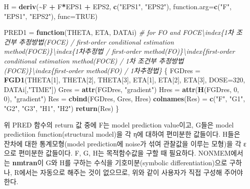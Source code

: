\documentclass[
  10pt,
  krantz2,
  a4paper]{krantz}
\newenvironment{Shaded}{\begin{snugshade}}{\end{snugshade}}
\newcommand{\CommentTok}[1]{\textcolor[rgb]{0.56,0.35,0.01}{\textit{#1}}}
\newcommand{\ControlFlowTok}[1]{\textcolor[rgb]{0.13,0.29,0.53}{\textbf{#1}}}
\newcommand{\DataTypeTok}[1]{\textcolor[rgb]{0.13,0.29,0.53}{#1}}
\newcommand{\DecValTok}[1]{\textcolor[rgb]{0.00,0.00,0.81}{#1}}
\newcommand{\KeywordTok}[1]{\textcolor[rgb]{0.13,0.29,0.53}{\textbf{#1}}}
\newcommand{\NormalTok}[1]{#1}
\newcommand{\OperatorTok}[1]{\textcolor[rgb]{0.81,0.36,0.00}{\textbf{#1}}}
\newcommand{\OtherTok}[1]{\textcolor[rgb]{0.56,0.35,0.01}{#1}}
\newcommand{\StringTok}[1]{\textcolor[rgb]{0.31,0.60,0.02}{#1}}
\newenvironment{Shaded}{\begin{snugshade}}{\end{snugshade}}
\theoremstyle{definition}
\theoremstyle{definition}
\theoremstyle{definition}
\theoremstyle{remark}
\begin{document}
\begin{Shaded}
\begin{Highlighting}[]
\NormalTok{H =}\StringTok{ }\KeywordTok{deriv}\NormalTok{(}\OperatorTok{\textasciitilde{}}\NormalTok{F }\OperatorTok{+}\StringTok{ }\NormalTok{F}\OperatorTok{*}\NormalTok{EPS1 }\OperatorTok{+}\StringTok{ }\NormalTok{EPS2, }\KeywordTok{c}\NormalTok{(}\StringTok{"EPS1"}\NormalTok{, }\StringTok{"EPS2"}\NormalTok{), }
          \DataTypeTok{function.arg=}\KeywordTok{c}\NormalTok{(}\StringTok{"F"}\NormalTok{, }\StringTok{"EPS1"}\NormalTok{, }\StringTok{"EPS2"}\NormalTok{), }
          \DataTypeTok{func=}\OtherTok{TRUE}\NormalTok{)}

\NormalTok{PRED1 =}\StringTok{ }\ControlFlowTok{function}\NormalTok{(THETA, ETA, DATAi)  }\CommentTok{\# for FO and FOCE\textbackslash{}index\{1차 조건부 추정방법(FOCE) / first{-}order conditional estimation method(FOCE)\}\textbackslash{}index\{1차추정법 / first{-}order method(FO)\}\textbackslash{}index\{first{-}order conditional estimation method(FOCE) / 1차 조건부 추정방법(FOCE)\}\textbackslash{}index\{first{-}order method(FO) / 1차추정법\}}
\NormalTok{\{}
\NormalTok{  FGDres =}\StringTok{ }\KeywordTok{FGD1}\NormalTok{(THETA[}\DecValTok{1}\NormalTok{], THETA[}\DecValTok{2}\NormalTok{], THETA[}\DecValTok{3}\NormalTok{], ETA[}\DecValTok{1}\NormalTok{], ETA[}\DecValTok{2}\NormalTok{], ETA[}\DecValTok{3}\NormalTok{], }\DataTypeTok{DOSE=}\DecValTok{320}\NormalTok{, }
\NormalTok{                DATAi[,}\StringTok{"TIME"}\NormalTok{])}
\NormalTok{  Gres =}\StringTok{ }\KeywordTok{attr}\NormalTok{(FGDres, }\StringTok{"gradient"}\NormalTok{)}
\NormalTok{  Hres =}\StringTok{ }\KeywordTok{attr}\NormalTok{(}\KeywordTok{H}\NormalTok{(FGDres, }\DecValTok{0}\NormalTok{, }\DecValTok{0}\NormalTok{), }\StringTok{"gradient"}\NormalTok{)}
\NormalTok{  Res =}\StringTok{ }\KeywordTok{cbind}\NormalTok{(FGDres, Gres, Hres)}
  \KeywordTok{colnames}\NormalTok{(Res) =}\StringTok{ }\KeywordTok{c}\NormalTok{(}\StringTok{"F"}\NormalTok{, }\StringTok{"G1"}\NormalTok{, }\StringTok{"G2"}\NormalTok{, }\StringTok{"G3"}\NormalTok{, }\StringTok{"H1"}\NormalTok{, }\StringTok{"H2"}\NormalTok{)}
  \KeywordTok{return}\NormalTok{(Res)}
\NormalTok{\}}
\end{Highlighting}
\end{Shaded}

위 PRED 함수의 return 값 중에 F는 model prediction value이고, G들은 model predictiion function(structural model)을 각 η에 대하여 편미분한 값들이다. H들은 잔차에 대한 통계모형(model prediction에 noise가 섞여 관찰값을 이루는 모형)을 각 ε으로 편미분한 값들이다. F, G, H는 목적함수값을 구할 때 필요하다. NONMEM에서는 \textbf{nmtran}이 G와 H를 구하는 수식을 기호미분(symbolic differentiation)으로 구하나, R에서는 자동으로 해주는 것이 없으므로, 위와 같이 사용자가 직접 구성해 주어야 한다.
\end{document}
